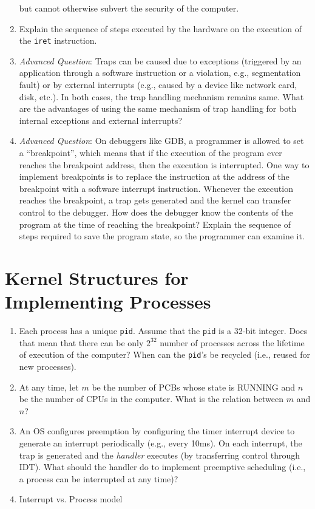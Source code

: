 \begin{enumerate}
but cannot otherwise subvert the security of the computer.
\item Explain the sequence of steps executed by the hardware on the execution of the {\tt iret}
instruction.
\item {\em Advanced Question}:
Traps can be caused due to exceptions (triggered by an application through a software
instruction or a violation, e.g., segmentation fault) or by external interrupts (e.g.,
caused by a device like network card, disk, etc.). In both cases, the trap handling mechanism
remains same. What are the advantages of using the same mechanism of trap handling for
both internal exceptions and external interrupts?
\item {\em Advanced Question}: On debuggers like GDB, a programmer is allowed to set a
``breakpoint'', which means that if the execution of the program ever reaches the breakpoint
address, then the execution is interrupted. One way to implement breakpoints is to
replace the instruction at the address of the breakpoint with a software interrupt
instruction. Whenever the execution reaches the breakpoint, a trap gets generated
and the kernel can transfer control to the debugger. How does the debugger know the
contents of the program at the time of reaching the breakpoint? Explain the sequence of
steps required to save the program state, so the programmer can examine it.
\end{enumerate}

\section{Kernel Structures for Implementing Processes}
\begin{enumerate}
\item Each process has a unique {\tt pid}. Assume that the {\tt pid} is a 32-bit integer.
Does that mean that there can be only $2^{32}$ number of processes across the lifetime
of execution of the computer? When can the {\tt pid}'s be recycled (i.e., reused for new
processes).
\item At any time, let $m$ be the number of PCBs whose state is RUNNING and $n$ be the
number of CPUs in the computer. What is the relation between $m$ and $n$?
\item An OS configures preemption by configuring the timer interrupt device to generate
an interrupt periodically (e.g., every 10ms). On each interrupt, the trap is generated
and the {\em handler} executes (by transferring control through IDT). What should the
handler do to implement preemptive scheduling (i.e., a process can be interrupted
at any time)?
\item Interrupt vs. Process model
\end{enumerate}

